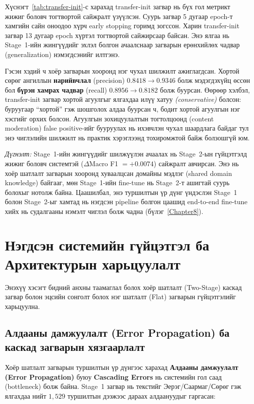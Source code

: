 Хүснэгт~\ref{tab:transfer-init}-с харахад transfer-init загвар нь бүх гол
метрикт жижиг боловч тогтвортой сайжралт үзүүлсэн.
Суурь загвар 5 дугаар epoch-т хамгийн сайн оноодоо хүрч early stopping горимд зогссон.
Харин transfer-init загвар 13 дугаар epoch хүртэл тогтвортой сайжирсаар байсан.
Энэ ялгаа нь Stage~1-ийн жингүүдийг эхлэл болгон ачаалснаар загварын ерөнхийлөх чадвар
(generalization) нэмэгдсэнийг илтгэнэ.

Гэсэн хэдий ч хоёр загварын хооронд нэг чухал шилжилт ажиглагдсан.
Хортой сөрөг ангиллын \textbf{нарийвчлал} (precision) $0.8418 \to 0.9346$ болж
мэдэгдэхүйц өссөн бол \textbf{бүрэн хамрах чадвар} (recall) $0.8956 \to 0.8182$
болж буурсан. Өөрөөр хэлбэл, transfer-init загвар хортой агуулгыг ялгахдаа
илүү хатуу \textit{(conservative)} болсон: буруугаар ``хортой'' гэж шошголох
алдаа буурсан ч, бодит хортой агуулгын нэг хэсгийг орхих болсон.
Агуулгын зохицуулалтын тогтолцоонд (content moderation) false positive-ийг
бууруулах нь ихэвчлэн чухал шаардлага байдаг тул энэ чиглэлийн шилжилт нь
практик хэрэглээнд тохиромжтой байж болзошгүй юм.

\textit{Дүгнэлт:} Stage~1-ийн жингүүдийг шилжүүлэн ачаалах нь Stage~2-ын
гүйцэтгэлд жижиг боловч системтэй ($\Delta$Macro F1 $= +0.0074$) сайжралт
авчирсан. Энэ нь хоёр шатлалт загварын хооронд хуваалцсан домайны мэдлэг
(shared domain knowledge) байгааг, мөн Stage~1-ийн fine-tune нь Stage~2-т
ашигтай суурь болохыг нотолж байна. Цаашилбал, энэ туршилтын үр дүнг үндэслэн
Stage~1 болон Stage~2-ыг хамтад нь нэгдсэн pipeline болгон цаашид end-to-end
fine-tune хийх нь судалгааны нэмэлт чиглэл болж чадна (бүлэг~\ref{Chapter8}).

\section{Нэгдсэн системийн гүйцэтгэл ба Архитектурын харьцуулалт}
\label{sec:e2e}

Энэхүү хэсэгт бидний анхны таамаглал болох хоёр шатлалт (Two-Stage) каскад
загвар болон эцсийн сонголт болох нэг шатлалт (Flat) загварын гүйцэтгэлийг
харьцуулна.

\subsection{Алдааны дамжуулалт (Error Propagation) ба каскад загварын хязгаарлалт}

Хоёр шатлалт загварын туршилтын үр дүнгээс харахад \textbf{Алдааны дамжуулалт
(Error Propagation)} буюу \textbf{Cascading Errors} нь системийн гол саад (bottleneck)
болж байна. Stage~1 загвар нь текстийг Эерэг/Саармаг/Сөрөг гэж ялгахдаа
нийт $1{,}529$ туршилтын дээжээс дараах алдаануудыг гаргасан:

